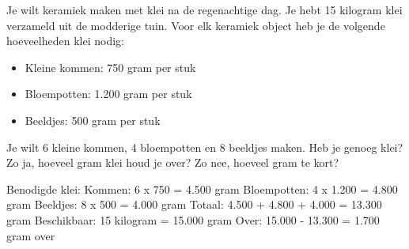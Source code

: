 \begin{opgave}
Je wilt keramiek maken met klei na de regenachtige dag. Je hebt 15 kilogram klei verzameld
uit de modderige tuin. Voor elk keramiek object heb je de volgende hoeveelheden klei nodig:

\begin{itemize}
\item Kleine kommen: 750 gram per stuk
\item Bloempotten: 1.200 gram per stuk
\item Beeldjes: 500 gram per stuk
\end{itemize}

Je wilt 6 kleine kommen, 4 bloempotten en 8 beeldjes maken. Heb je genoeg klei? Zo ja,
hoeveel gram klei houd je over? Zo nee, hoeveel gram te kort?
\end{opgave}

\begin{oplossing}
Benodigde klei:
Kommen: 6 x 750 = 4.500 gram
Bloempotten: 4 x 1.200 = 4.800 gram  
Beeldjes: 8 x 500 = 4.000 gram
Totaal: 4.500 + 4.800 + 4.000 = 13.300 gram
Beschikbaar: 15 kilogram = 15.000 gram
Over: 15.000 - 13.300 = 1.700 gram over
\end{oplossing}